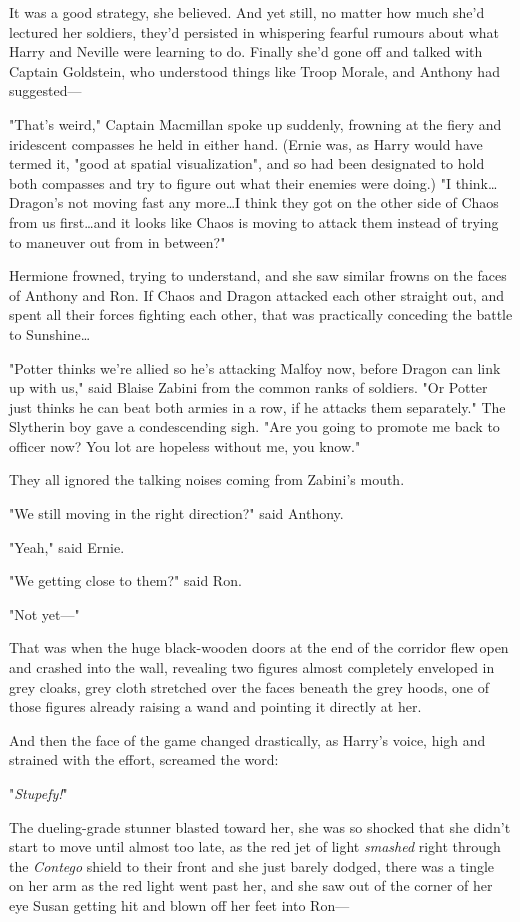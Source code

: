 It was a good strategy, she believed. And yet still, no matter how much she'd
lectured her soldiers, they'd persisted in whispering fearful rumours about what
Harry and Neville were learning to do. Finally she'd gone off and talked with
Captain Goldstein, who understood things like Troop Morale, and Anthony had
suggested—

"That's weird," Captain Macmillan spoke up suddenly, frowning at the fiery and
iridescent compasses he held in either hand. (Ernie was, as Harry would have
termed it, "good at spatial visualization", and so had been designated to hold
both compasses and try to figure out what their enemies were doing.) "I
think…Dragon's not moving fast any more…I think they got on the
other side of Chaos from us first…and it looks like Chaos is moving to
attack them instead of trying to maneuver out from in between?"

Hermione frowned, trying to understand, and she saw similar frowns on the faces
of Anthony and Ron. If Chaos and Dragon attacked each other straight out, and
spent all their forces fighting each other, that was practically conceding the
battle to Sunshine…

"Potter thinks we're allied so he's attacking Malfoy now, before Dragon can
link up with us," said Blaise Zabini from the common ranks of soldiers. "Or
Potter just thinks he can beat both armies in a row, if he attacks them
separately." The Slytherin boy gave a condescending sigh. "Are you going to
promote me back to officer now? You lot are hopeless without me, you know."

They all ignored the talking noises coming from Zabini's mouth.

"We still moving in the right direction?" said Anthony.

"Yeah," said Ernie.

"We getting close to them?" said Ron.

"Not yet—"

That was when the huge black-wooden doors at the end of the corridor flew open
and crashed into the wall, revealing two figures almost completely enveloped in
grey cloaks, grey cloth stretched over the faces beneath the grey hoods, one of
those figures already raising a wand and pointing it directly at her.

And then the face of the game changed drastically, as Harry's voice, high and
strained with the effort, screamed the word:

"\emph{Stupefy!}"

The dueling-grade stunner blasted toward her, she was so shocked that she
didn't start to move until almost too late, as the red jet of light
\emph{smashed} right through the \emph{Contego} shield to their front and she
just barely dodged, there was a tingle on her arm as the red light went past
her, and she saw out of the corner of her eye Susan getting hit and blown off
her feet into Ron—

